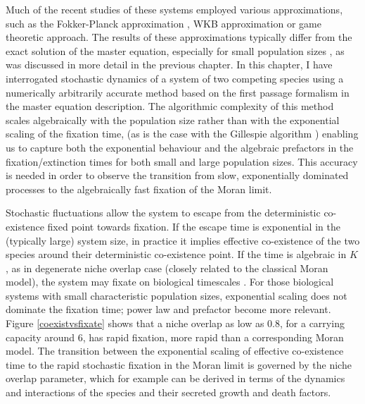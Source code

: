 Much of the recent studies of these systems employed various approximations, such as the Fokker-Planck approximation \cite{Chotibut2015,Dobrinevski2012,Fisher2014,Constable2015,Lin2012}, WKB approximation \cite{Kessler2007,Gabel2013} or game theoretic \cite{Antal2006} approach. 
The results of these approximations typically differ from the exact solution of the master equation, especially for small population sizes \cite{Doering2005,Kessler2007,Ovaskainen2010,Assaf2016,Badali2018}, as was discussed in more detail in the previous chapter. 
In this chapter, I have interrogated stochastic dynamics of a system of two competing species using a numerically arbitrarily accurate method based on the first passage formalism in the master equation description. 
The algorithmic complexity of this method scales algebraically with the population size rather than with the exponential scaling of the fixation time, (as is the case with the Gillespie algorithm \cite{Gillespie1977}) enabling us to capture both the exponential behaviour and the algebraic prefactors in the fixation/extinction times for both small and large population sizes. %
This accuracy is needed in order to observe the transition from slow, exponentially dominated processes to the algebraically fast fixation of the Moran limit. 

Stochastic fluctuations allow the system to escape from the deterministic co-existence fixed point towards fixation. 
If the escape time is exponential in the (typically large) system size, in practice it implies effective co-existence of the two species around their deterministic co-existence point. 
If the time is algebraic in $K$, as in degenerate niche overlap case (closely related to the classical Moran model), the system may fixate on biological timescales \cite{Kimura1964,Moran1962}. 
For those biological systems with small characteristic population sizes, exponential scaling does not dominate the fixation time; power law and prefactor become more relevant. 
Figure \ref{coexistvsfixate} shows that a niche overlap as low as $0.8$, for a carrying capacity around $6$, has rapid fixation, more rapid than a corresponding Moran model. %
The transition between the exponential scaling of effective co-existence time to the rapid stochastic fixation in the Moran limit is governed by the niche overlap parameter, which for example can be derived in terms of the dynamics and interactions of the species and their secreted growth and death factors. %


